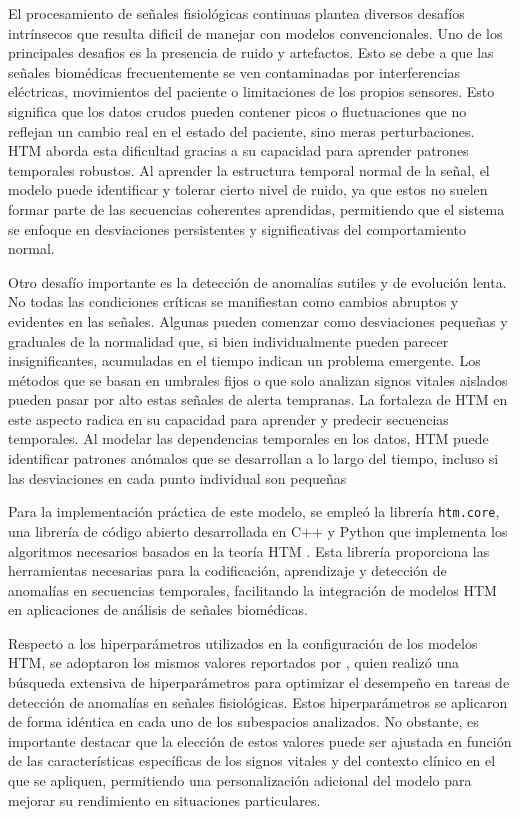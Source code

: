 El procesamiento de señales fisiológicas continuas plantea diversos desafíos intrínsecos que resulta dificil de manejar con modelos convencionales. Uno de los principales desafios es la presencia de ruido y artefactos. Esto se debe a que las señales biomédicas frecuentemente se ven contaminadas por interferencias eléctricas, movimientos del paciente o limitaciones de los propios sensores. Esto significa que los datos crudos pueden contener picos o fluctuaciones que no reflejan un cambio real en el estado del paciente, sino meras perturbaciones. HTM aborda esta dificultad gracias a su capacidad para aprender patrones temporales robustos. Al aprender la estructura temporal normal de la señal, el modelo puede identificar y tolerar cierto nivel de ruido, ya que estos no suelen formar parte de las secuencias coherentes aprendidas, permitiendo que el sistema se enfoque en desviaciones persistentes y significativas del comportamiento normal.

Otro desafío importante es la detección de anomalías sutiles y de evolución lenta. No todas las condiciones críticas se manifiestan como cambios abruptos y evidentes en las señales. Algunas pueden comenzar como desviaciones pequeñas y graduales de la normalidad que, si bien individualmente pueden parecer insignificantes, acumuladas en el tiempo indican un problema emergente. Los métodos que se basan en umbrales fijos o que solo analizan signos vitales aislados pueden pasar por alto estas señales de alerta tempranas. La fortaleza de HTM en este aspecto radica en su capacidad para aprender y predecir secuencias temporales. Al modelar las dependencias temporales en los datos, HTM puede identificar patrones anómalos que se desarrollan a lo largo del tiempo, incluso si las desviaciones en cada punto individual son pequeñas \parencite{AHMAD2017134}

Para la implementación práctica de este modelo, se empleó la librería \texttt{htm.core}, una librería de código abierto desarrollada en C++ y Python que implementa los algoritmos necesarios basados en la teoría HTM \parencite{htmcore2019}. Esta librería proporciona las herramientas necesarias para la codificación, aprendizaje y detección de anomalías en secuencias temporales, facilitando la integración de modelos HTM en aplicaciones de análisis de señales biomédicas.

Respecto a los hiperparámetros utilizados en la configuración de los modelos HTM, se adoptaron los mismos valores reportados por \textcite{Vargas2023}, quien realizó una búsqueda extensiva de hiperparámetros para optimizar el desempeño en tareas de detección de anomalías en señales fisiológicas. Estos hiperparámetros se aplicaron de forma idéntica en cada uno de los subespacios analizados. No obstante, es importante destacar que la elección de estos valores puede ser ajustada en función de las características específicas de los signos vitales y del contexto clínico en el que se apliquen, permitiendo una personalización adicional del modelo para mejorar su rendimiento en situaciones particulares.

